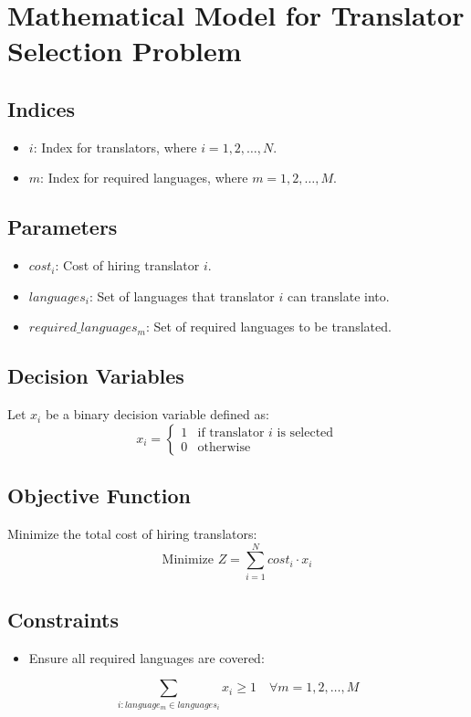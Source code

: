 \documentclass{article}
\begin{document}
\section*{Mathematical Model for Translator Selection Problem}

\subsection*{Indices}
\begin{itemize}
    \item $i$: Index for translators, where $i = 1, 2, \ldots, N$.
    \item $m$: Index for required languages, where $m = 1, 2, \ldots, M$.
\end{itemize}

\subsection*{Parameters}
\begin{itemize}
    \item $cost_i$: Cost of hiring translator $i$.
    \item $languages_i$: Set of languages that translator $i$ can translate into.
    \item $required\_languages_m$: Set of required languages to be translated.
\end{itemize}

\subsection*{Decision Variables}
Let $x_i$ be a binary decision variable defined as:
\[
x_i =
\begin{cases}
1 & \text{if translator } i \text{ is selected} \\
0 & \text{otherwise}
\end{cases}
\]

\subsection*{Objective Function}
Minimize the total cost of hiring translators:
\[
\text{Minimize } Z = \sum_{i=1}^{N} cost_i \cdot x_i
\]

\subsection*{Constraints}
\begin{itemize}
    \item Ensure all required languages are covered:
\end{itemize}
\[
\sum_{i: language_m \in languages_i} x_i \geq 1 \quad \forall m = 1, 2, \ldots, M
\]
\end{document}
